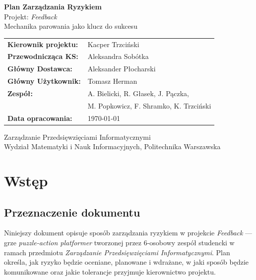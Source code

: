 \documentclass[11pt,a4paper]{article}
\newcommand{\docTitle}{Plan Zarządzania Ryzykiem}
\begin{document}
	
	\begin{titlepage}
		\centering
		\vspace*{2cm}
		{\LARGE\bfseries\color{accent} \docTitle}\\[0.5cm]
		{\large Projekt: \textit{Feedback}}\\[0.3cm]
		{\normalsize Mechanika parowania jako klucz do sukcesu}\\[2cm]
		
		\begin{tabular}{ll}
			\textbf{Kierownik projektu:}   & Kacper Trzciński \\[0.3em]
			\textbf{Przewodnicząca KS:}    & Aleksandra Sobótka \\[0.3em]
			\textbf{Główny Dostawca:}      & Aleksander Płocharski \\[0.3em]
			\textbf{Główny Użytkownik:}    & Tomasz Herman \\[0.3em]
			\textbf{Zespół:}               & A. Bielicki, R. Głasek, J. Pączka, \\
			& M. Popkowicz, F. Shramko, K. Trzciński \\[0.3em]
			\textbf{Data opracowania:}     & \today \\[0.3em]
		\end{tabular}
		
		\vfill
		{\small Zarządzanie Przedsięwzięciami Informatycznymi\\
			Wydział Matematyki i Nauk Informacyjnych, Politechnika Warszawska}
	\end{titlepage}
	
	\tableofcontents
	\newpage
	
	\section{Wstęp}\label{sec:wstep}
	
	\subsection{Przeznaczenie dokumentu}
	Niniejszy dokument opisuje sposób zarządzania ryzykiem w projekcie \textit{Feedback} ---
	grze \textit{puzzle-action platformer} tworzonej przez 6-osobowy zespół studencki w ramach
	przedmiotu \textit{Zarządzanie Przedsięwzięciami Informatycznymi}. Plan określa, jak ryzyko będzie
	oceniane, planowane i wdrażane, w jaki sposób będzie komunikowane oraz jakie tolerancje
	przyjmuje kierownictwo projektu.
	
\end{document}

